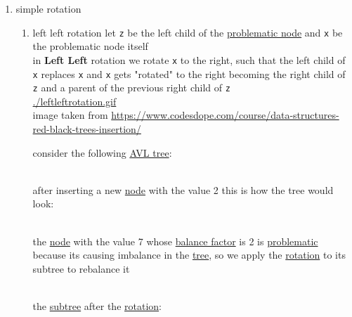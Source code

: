 \documentclass[a4paper,12pt]{article}
\begin{document}
\begin{enumerate}
\item simple rotation
\label{sec:orga681800}
\begin{enumerate}
\item left left rotation
\label{sec:orga4dd83f}
let \texttt{z} be the left child of the \hyperref[sec:org634a573]{problematic node} and \texttt{x} be the problematic node itself\\[0pt]
in \textbf{Left Left} rotation we rotate \texttt{x} to the right, such that the left child of \texttt{x} replaces \texttt{x} and \texttt{x} gets "rotated" to the right becoming the right child of \texttt{z} and a parent of the previous right child of \texttt{z}\\[0pt]

\url{./leftleftrotation.gif}\\[0pt]
image taken from \url{https://www.codesdope.com/course/data-structures-red-black-trees-insertion/}\\[0pt]

\begin{my_example}
consider the following \hyperref[sec:orge9da911]{AVL tree}:\\[0pt]
\begin{center}

\end{center}\\[0pt]

after inserting a new \hyperref[sec:orgec4976f]{node} with the value 2 this is how the tree would look:\\[0pt]
\begin{center}

\end{center}\\[0pt]

the \hyperref[sec:orgec4976f]{node} with the value 7 whose \hyperref[sec:org98c9b00]{balance factor} is 2 is \hyperref[sec:org634a573]{problematic} because its causing imbalance in the \hyperref[sec:orge9da911]{tree}, so we apply the \hyperref[sec:orgcca3d84]{rotation} to its subtree to rebalance it\\[0pt]
\begin{center}

\end{center}\\[0pt]

the \hyperref[sec:orgaaf7b83]{subtree} after the \hyperref[sec:orgcca3d84]{rotation}:\\[0pt]
\begin{center}

\end{center}\\[0pt]


\end{my_example}
\end{enumerate}
\end{enumerate}
\end{document}
